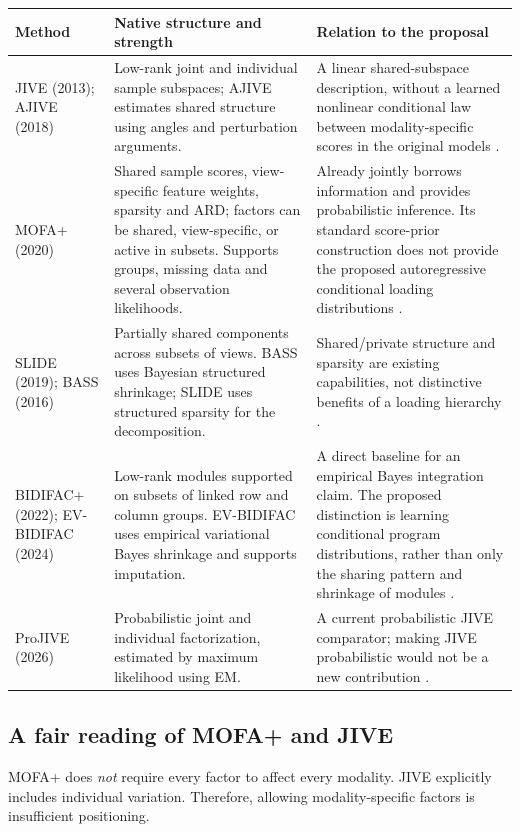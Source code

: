 \documentclass[11pt,a4paper]{article}
\numberwithin{equation}{section}
\begin{document}
\begingroup\small
\renewcommand{\arraystretch}{1.13}
\begin{tabular}{@{}P{.19\textwidth}P{.37\textwidth}P{.38\textwidth}@{}}
\toprule
Method & Native structure and strength & Relation to the proposal\\
\midrule
JIVE (2013); AJIVE (2018)
&
Low-rank joint and individual sample subspaces; AJIVE estimates shared
structure using angles and perturbation arguments.
&
A linear shared-subspace description, without a learned nonlinear
conditional law between modality-specific scores in the original models
\cite{jive,ajive}.\\[5pt]
MOFA+ (2020)
&
Shared sample scores, view-specific feature weights, sparsity and ARD;
factors can be shared, view-specific, or active in subsets. Supports groups,
missing data and several observation likelihoods.
&
Already jointly borrows information and provides probabilistic inference.
Its standard score-prior construction does not provide the proposed
autoregressive conditional loading distributions \cite{mofa}.\\[5pt]
SLIDE (2019); BASS (2016)
&
Partially shared components across subsets of views. BASS uses Bayesian
structured shrinkage; SLIDE uses structured sparsity for the decomposition.
&
Shared/private structure and sparsity are existing capabilities, not
distinctive benefits of a loading hierarchy \cite{slide,bass}.\\[5pt]
BIDIFAC+ (2022); EV-BIDIFAC (2024)
&
Low-rank modules supported on subsets of linked row and column groups.
EV-BIDIFAC uses empirical variational Bayes shrinkage and supports
imputation.
&
A direct baseline for an empirical Bayes integration claim. The proposed
distinction is learning conditional program distributions, rather than
only the sharing pattern and shrinkage of modules
\cite{bidifac,evbidifac}.\\[5pt]
ProJIVE (2026)
&
Probabilistic joint and individual factorization, estimated by maximum
likelihood using EM.
&
A current probabilistic JIVE comparator; making JIVE probabilistic
would not be a new contribution \cite{projive}.\\
\bottomrule
\end{tabular}
\endgroup

\subsection*{A fair reading of MOFA+ and JIVE}
MOFA+ does \emph{not} require every factor to affect every modality.
JIVE explicitly includes individual variation. Therefore, allowing
modality-specific factors is insufficient positioning.
\end{document}
